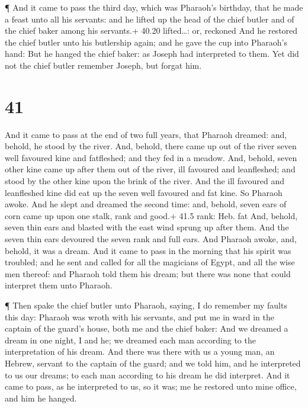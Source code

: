  ¶ And it came to pass the third day, which was Pharaoh's
birthday, that he made a feast unto all his servants: and he lifted up
the head of the chief butler and of the chief baker among his servants.+
40.20 lifted\ldots: or, reckoned  And he restored the chief
butler unto his butlership again; and he gave the cup into Pharaoh's
hand:  But he hanged the chief baker: as Joseph had
interpreted to them.  Yet did not the chief butler remember
Joseph, but forgat him.

\hypertarget{section-40}{%
\section{41}\label{section-40}}

 And it came to pass at the end of two full years, that
Pharaoh dreamed: and, behold, he stood by the river.  And,
behold, there came up out of the river seven well favoured kine and
fatfleshed; and they fed in a meadow.  And, behold, seven
other kine came up after them out of the river, ill favoured and
leanfleshed; and stood by the other kine upon the brink of the river.
 And the ill favoured and leanfleshed kine did eat up the
seven well favoured and fat kine. So Pharaoh awoke.  And he
slept and dreamed the second time: and, behold, seven ears of corn came
up upon one stalk, rank and good.+ 41.5 rank: Heb. fat  And,
behold, seven thin ears and blasted with the east wind sprung up after
them.  And the seven thin ears devoured the seven rank and
full ears. And Pharaoh awoke, and, behold, it was a dream. 
And it came to pass in the morning that his spirit was troubled; and he
sent and called for all the magicians of Egypt, and all the wise men
thereof: and Pharaoh told them his dream; but there was none that could
interpret them unto Pharaoh.

 ¶ Then spake the chief butler unto Pharaoh, saying, I do
remember my faults this day:  Pharaoh was wroth with his
servants, and put me in ward in the captain of the guard's house, both
me and the chief baker:  And we dreamed a dream in one
night, I and he; we dreamed each man according to the interpretation of
his dream.  And there was there with us a young man, an
Hebrew, servant to the captain of the guard; and we told him, and he
interpreted to us our dreams; to each man according to his dream he did
interpret.  And it came to pass, as he interpreted to us,
so it was; me he restored unto mine office, and him he hanged.

